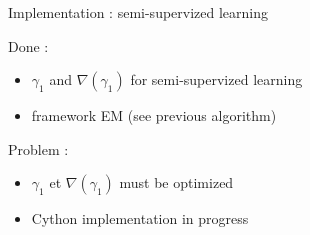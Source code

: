 \documentclass[aspectratio=1610,usenames,dvipsnames]{beamer}
\begin{document}
\begin{frame}{Implementation : semi-supervized learning}

    \begin{block}{Done :}
        \begin{itemize}
            \item $\gamma_1$ and $\nabla(\gamma_1)$ for semi-supervized learning
            \item framework EM (see previous algorithm)
        \end{itemize}
    \end{block}
    \begin{block}{Problem :}
        \begin{itemize}
            \item $\gamma_1$ et $\nabla(\gamma_1)$ must be optimized
            \item Cython implementation in progress
        \end{itemize}
        
    \end{block}
    
\end{frame}
\end{document}
